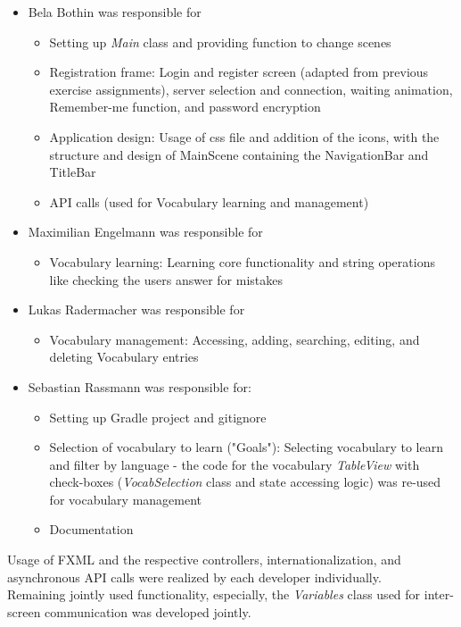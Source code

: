 \begin{itemize}
    \item Bela Bothin was responsible for %
    \begin{itemize}
        \item Setting up \textit{Main} class and providing function to change scenes
        \item Registration frame: Login and register screen (adapted from previous exercise assignments), server selection and connection, waiting animation, Remember-me function, and password encryption
        \item Application design: Usage of css file and addition of the icons, with the structure and design of MainScene containing the NavigationBar and TitleBar
        \item API calls (used for Vocabulary learning and management)
    \end{itemize}
\item Maximilian Engelmann was responsible for %
    \begin{itemize}
        \item Vocabulary learning: Learning core functionality and string operations like checking the users answer for mistakes
    \end{itemize}
\item Lukas Radermacher was responsible for %
    \begin{itemize}
        \item Vocabulary management: Accessing, adding, searching, editing, and deleting Vocabulary entries
    \end{itemize}
\item Sebastian Rassmann was responsible for: %
    \begin{itemize}
        \item Setting up Gradle project and gitignore
        \item Selection of vocabulary to learn ("Goals"): Selecting vocabulary to learn and filter by language - the code for the vocabulary \textit{TableView} with check-boxes (\textit{VocabSelection} class and state accessing logic) was re-used for vocabulary management
        \item Documentation
    \end{itemize}
\end{itemize}

Usage of FXML and the respective controllers, internationalization, and asynchronous API calls were realized by each developer individually. \\
Remaining jointly used functionality, especially, the \textit{Variables} class used for inter-screen communication was developed jointly. 

